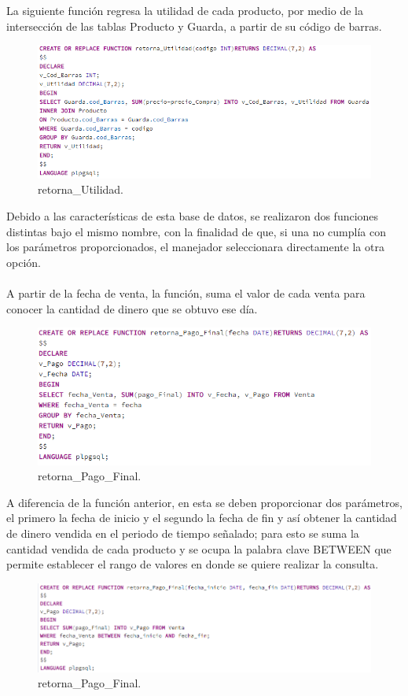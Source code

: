 \documentclass[12pt,letterpaper]{article}
\begin{document}
	La siguiente función regresa la utilidad de cada producto, por medio de la intersección de las tablas Producto y Guarda, a partir de su código de barras.
	\begin{figure}[H]
		\centering
		\includegraphics[scale=0.70]{Documentacion/img/Funcion_Utilidad.PNG}
		\caption{retorna\_Utilidad.}
	\end{figure}
	Debido a las características de esta base de datos, se realizaron dos funciones distintas bajo el mismo nombre, con la finalidad de que, si una no cumplía con los parámetros proporcionados, el manejador seleccionara directamente la otra opción. \\
	\\A partir de la fecha de venta, la función, suma el valor de cada venta para conocer la cantidad de dinero que se obtuvo ese día. 
	\begin{figure}[H]
		\centering
		\includegraphics[scale=0.70]{Documentacion/img/retornaPagoFinao.PNG}
		\caption{retorna\_Pago\_Final.}
	\end{figure}
	A diferencia de la función anterior, en esta se deben proporcionar dos parámetros, el primero la fecha de inicio y el segundo la fecha de fin y así obtener la cantidad de dinero vendida en el periodo de tiempo señalado; para esto se suma la cantidad vendida de cada producto y se ocupa la palabra clave BETWEEN que permite establecer el rango de valores en donde se quiere realizar la consulta.
	\begin{figure}[H]
		\centering
		\includegraphics[scale=0.70]{Documentacion/img/retornaPagoFinal_2.PNG}
		\caption{retorna\_Pago\_Final.}
	\end{figure}
\end{document}
